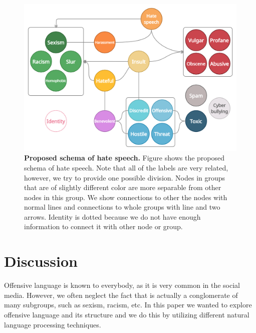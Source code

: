 \documentclass[fleqn,moreauthors,10pt]{ds_report}
\begin{document}
\begin{figure}[htb]\centering
	\includegraphics[width= \linewidth]{final_schema.png}
	\caption{\textbf{Proposed schema of hate speech.} Figure shows the proposed schema of hate speech. Note that all of the labels are very related, however, we try to provide one possible division. Nodes in groups that are of slightly different color are more separable from other nodes in this group. We show connections to other the nodes with normal lines and connections to whole groups with line and two arrows. Identity is dotted because we do not have enough information to connect it with other node or group.}
	\label{fig:schema}
\end{figure}





\section{Discussion}
\label{sec:disc}
Offensive language is known to everybody, as it is very common in the social media. However, we often neglect the fact that is actually a conglomerate of many subgroups, such as sexism, racism, etc. In this paper we wanted to explore offensive language and its structure and we do this by utilizing different natural language processing techniques. 
\end{document}
